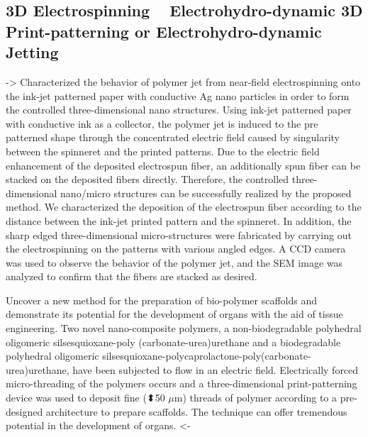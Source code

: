 \documentclass[5p,,preprint,12pt,twocolumn]{elsarticle}
\begin{document}
\subsection{3D Electrospinning \unskip~\protect\cite{527120:11974313} \mbox{}\protect\newline Electrohydro-dynamic 3D Print-patterning or Electrohydro-dynamic Jetting \unskip~\protect\cite{527120:11974310}}-{\textgreater} Characterized the behavior of polymer jet from near-field electrospinning onto the ink-jet patterned paper with conductive Ag nano particles in order to form the controlled three-dimensional nano structures. Using ink-jet patterned paper with conductive ink as a collector, the polymer jet is induced to the pre patterned shape through the concentrated electric field caused by singularity between the spinneret and the printed patterns. Due to the electric field enhancement of the deposited electrospun fiber, an additionally spun fiber can be stacked on the deposited fibers directly. Therefore, the controlled three-dimensional nano/micro structures can be successfully realized by the proposed method. We characterized the deposition of the electrospun fiber according to the distance between the ink-jet printed pattern and the spinneret. In addition, the sharp edged three-dimensional micro-structures were fabricated by carrying out the electrospinning on the patterns with various angled edges. A CCD camera was used to observe the behavior of the polymer jet, and the SEM image was analyzed to confirm that the fibers are stacked as desired.

Uncover a new method for the preparation of bio-polymer scaffolds and demonstrate its potential for the development of organs with the aid of tissue engineering. Two novel nano-composite polymers, a non-biodegradable polyhedral oligomeric silsesquioxane-poly (carbonate-urea)urethane and a biodegradable polyhedral oligomeric silsesquioxane-polycaprolactone-poly(carbonate-urea)urethane, have been subjected to flow in an electric field. Electrically forced micro-threading of the polymers occurs and a three-dimensional print-patterning device was used to deposit fine (⬍50 \ensuremath{\mu}m) threads of polymer according to a pre-designed architecture to prepare scaffolds. The technique can offer tremendous potential in the development of organs. {\textless}-
\end{document}
